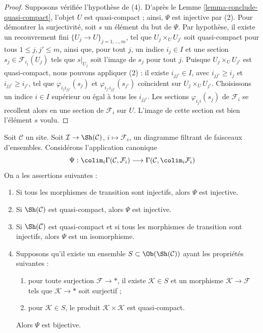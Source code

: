 \begin{proof}
\medskip\noindent
Supposons vérifiée l’hypothèse de (4). D’après le Lemme
\ref{lemma-conclude-quasi-compact}, l’objet $U$ est quasi-compact ;
ainsi, $\Psi$ est injective par (2).
Pour démontrer la surjectivité, soit $s$ un élément du but de $\Psi$.
Par hypothèse, il existe un recouvrement fini
$\{U_j \to U\}_{j = 1, \ldots, m}$, tel que $U_j \times_U U_{j'}$
soit quasi-compact pour tous $1 \leq j, j' \leq m$, ainsi que,
pour tout $j$, un indice $i_j \in I$ et une section
$s_j \in \mathcal{F}_{i_j}(U_j)$ tels que $s|_{U_j}$ soit l’image de $s_j$
pour tout $j$.
Puisque $U_j \times_U U_{j'}$ est quasi-compact, nous pouvons appliquer (2) :
il existe $i_{jj'} \in I$, avec $i_{jj'} \geq i_j$ et
$i_{jj'} \geq i_{j'}$, tel que
$\varphi_{i_ji_{jj'}}(s_j)$ et $\varphi_{i_{j'}i_{jj'}}(s_{j'})$
coïncident sur $U_j \times_U U_{j'}$. Choisissons un indice $i \in I$
supérieur ou égal à tous les $i_{jj'}$. Les sections
$\varphi_{i_ji}(s_j)$ de $\mathcal{F}_i$ se recollent alors
en une section de $\mathcal{F}_i$ sur $U$. L’image de cette section
est bien l’élément $s$ voulu.
\end{proof}

\begin{lemma}
\label{lemma-directed-colimits-global-sections}
Soit $\mathcal{C}$ un site. Soit
$\mathcal{I} \to \Sh(\mathcal{C})$, $i \mapsto \mathcal{F}_i$,
un diagramme filtrant de faisceaux d’ensembles.
Considérons l’application canonique
$$
\Psi :
\colim_i \Gamma(\mathcal{C}, \mathcal{F}_i)
\longrightarrow
\Gamma(\mathcal{C}, \colim_i \mathcal{F}_i)
$$
On a les assertions suivantes :
\begin{enumerate}
\item Si tous les morphismes de transition sont injectifs, alors $\Psi$ est injective.
\item Si $\Sh(\mathcal{C})$ est quasi-compact, alors $\Psi$ est injective.
\item Si $\Sh(\mathcal{C})$ est quasi-compact et si tous les morphismes
de transition sont injectifs, alors $\Psi$ est un isomorphisme.
\item Supposons qu’il existe un ensemble $S \subset \Ob(\Sh(\mathcal{C}))$
ayant les propriétés suivantes :
\begin{enumerate}
\item pour toute surjection $\mathcal{F} \to *$, il existe
$\mathcal{K} \in S$ et un morphisme $\mathcal{K} \to \mathcal{F}$
tels que $\mathcal{K} \to *$ soit surjectif ;
\item pour $\mathcal{K} \in S$, le produit
$\mathcal{K} \times \mathcal{K}$ est quasi-compact.
\end{enumerate}
Alors $\Psi$ est bijective.
\end{enumerate}
\end{lemma}

